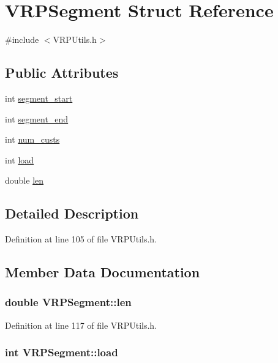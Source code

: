 \hypertarget{struct_v_r_p_segment}{
\section{VRPSegment Struct Reference}
\label{struct_v_r_p_segment}
}


{\ttfamily \#include $<$VRPUtils.h$>$}

\subsection*{Public Attributes}
\begin{DoxyCompactItemize}
\item 
int \hyperlink{struct_v_r_p_segment_ab545be974d0668c20662853470895ad5}{segment\_\-start}
\item 
int \hyperlink{struct_v_r_p_segment_a8820dcf204c2c3b146f74066ae127671}{segment\_\-end}
\item 
int \hyperlink{struct_v_r_p_segment_a99f4fbbcd109957cea9fa07fe1329f1f}{num\_\-custs}
\item 
int \hyperlink{struct_v_r_p_segment_a5b91607080aa38c2e576c5c6dec3f7a2}{load}
\item 
double \hyperlink{struct_v_r_p_segment_aec2056074cb9c9d7ab44bc2cc11df53d}{len}
\end{DoxyCompactItemize}


\subsection{Detailed Description}


Definition at line 105 of file VRPUtils.h.



\subsection{Member Data Documentation}
\hypertarget{struct_v_r_p_segment_aec2056074cb9c9d7ab44bc2cc11df53d}{
\subsubsection[{len}]{\setlength{\rightskip}{0pt plus 5cm}double {\bf VRPSegment::len}}}
\label{struct_v_r_p_segment_aec2056074cb9c9d7ab44bc2cc11df53d}


Definition at line 117 of file VRPUtils.h.

\hypertarget{struct_v_r_p_segment_a5b91607080aa38c2e576c5c6dec3f7a2}{
\subsubsection[{load}]{\setlength{\rightskip}{0pt plus 5cm}int {\bf VRPSegment::load}}}
\label{struct_v_r_p_segment_a5b91607080aa38c2e576c5c6dec3f7a2}


